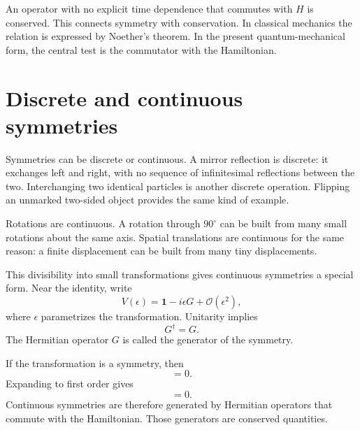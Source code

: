 \begin{classroomqa}
\end{classroomqa}

An operator with no explicit time dependence that commutes with \(H\) is conserved. This connects symmetry with conservation. In classical mechanics the relation is expressed by Noether's theorem. In the present quantum-mechanical form, the central test is the commutator with the Hamiltonian.

\section{Discrete and continuous symmetries}

Symmetries can be discrete or continuous. A mirror reflection is discrete: it exchanges left and right, with no sequence of infinitesimal reflections between the two. Interchanging two identical particles is another discrete operation. Flipping an unmarked two-sided object provides the same kind of example.

Rotations are continuous. A rotation through \(90^\circ\) can be built from many small rotations about the same axis. Spatial translations are continuous for the same reason: a finite displacement can be built from many tiny displacements.

This divisibility into small transformations gives continuous symmetries a special form. Near the identity, write
\begin{equation}
V(\epsilon)
=
\mathbf 1-i\epsilon G+\mathcal O(\epsilon^2),
\end{equation}
where \(\epsilon\) parametrizes the transformation. Unitarity implies
\begin{equation}
G^\dagger=G.
\end{equation}
The Hermitian operator \(G\) is called the generator of the symmetry.

If the transformation is a symmetry, then
\begin{equation}
[H,V(\epsilon)]=0.
\end{equation}
Expanding to first order gives
\begin{equation}
[H,G]=0.
\end{equation}
Continuous symmetries are therefore generated by Hermitian operators that commute with the Hamiltonian. Those generators are conserved quantities.

